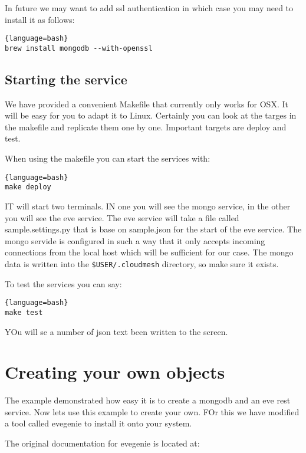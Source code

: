 In future we may want to add ssl authentication in which case you
may
need to install it as follows:

\begin{lstlisting}{language=bash}
brew install mongodb --with-openssl
\end{lstlisting}

\subsection{Starting the service}\label{starting-the-service}

We have provided a convenient Makefile that currently only works for
OSX. It will be easy for you to adapt it to Linux. Certainly you can
look at the targes in the makefile and replicate them one by one.
Important targets are deploy and test.

When using the makefile you can start the services with:

\begin{lstlisting}{language=bash}
make deploy
\end{lstlisting}

IT will start two terminals. IN one you will see the mongo service, in
the other you will see the eve service. The eve service will take a file
called sample.settings.py that is base on sample.json for the start of
the eve service. The mongo servide is configured in such a way that it
only accepts incoming connections from the local host which will be
sufficient for our case. The mongo data is written into the
\verb|$USER/.cloudmesh| directory, so make sure it exists.

To test the services you can say:

\begin{lstlisting}{language=bash}
make test
\end{lstlisting}

YOu will se a number of json text been written to the screen.

\section{Creating your own objects}\label{creating-your-own-objects}

The example demonstrated how easy it is to create a mongodb and an eve
rest service. Now lets use this example to create your own. FOr this we
have modified a tool called evegenie to install it onto your system.

The original documentation for evegenie is located at:

